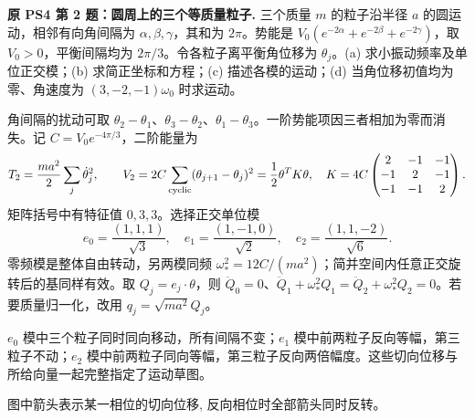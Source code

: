 \begin{example}
\textbf{原 PS4 第 2 题：圆周上的三个等质量粒子.} 
三个质量 $m$ 的粒子沿半径 $a$ 的圆运动，相邻有向角间隔为 $\alpha,\beta,\gamma$，其和为 $2\pi$。势能是 $V_0(e^{-2\alpha}+e^{-2\beta}+e^{-2\gamma})$，取 $V_0>0$，平衡间隔均为 $2\pi/3$。令各粒子离平衡角位移为 $\theta_j$。(a) 求小振动频率及单位正交模；(b) 求简正坐标和方程；(c) 描述各模的运动；(d) 当角位移初值均为零、角速度为 $(3,-2,-1)\omega_0$ 时求运动。
\end{example}
\begin{solution}
角间隔的扰动可取 $\theta_2-\theta_1$、$\theta_3-\theta_2$、$\theta_1-\theta_3$。一阶势能项因三者相加为零而消失。记 $C=V_0e^{-4\pi/3}$，二阶能量为
\[
 T_2=\frac{ma^2}2\sum_j\dot\theta_j^2,\qquad
 V_2=2C\sum_{\rm cyclic}(\theta_{j+1}-\theta_j)^2
 =\frac12\theta^TK\theta,\quad
 K=4C\begin{pmatrix}2&-1&-1\\-1&2&-1\\-1&-1&2\end{pmatrix}.
\]
矩阵括号中有特征值 $0,3,3$。选择正交单位模
\[
 e_0=\frac{(1,1,1)}{\sqrt3},\quad
 e_1=\frac{(1,-1,0)}{\sqrt2},\quad
 e_2=\frac{(1,1,-2)}{\sqrt6}.
\]
零频模是整体自由转动，另两模同频 $\omega_*^2=12C/(ma^2)$；简并空间内任意正交旋转后的基同样有效。取 $Q_j=e_j\cdot\theta$，则 $\ddot Q_0=0$、$\ddot Q_1+\omega_*^2Q_1=\ddot Q_2+\omega_*^2Q_2=0$。若要质量归一化，改用 $q_j=\sqrt{ma^2}Q_j$。

$e_0$ 模中三个粒子同时同向移动，所有间隔不变；$e_1$ 模中前两粒子反向等幅，第三粒子不动；$e_2$ 模中前两粒子同向等幅，第三粒子反向两倍幅度。这些切向位移与所给向量一起完整指定了运动草图。
\begin{center}
\end{center}
图中箭头表示某一相位的切向位移, 反向相位时全部箭头同时反转。



\end{solution}
